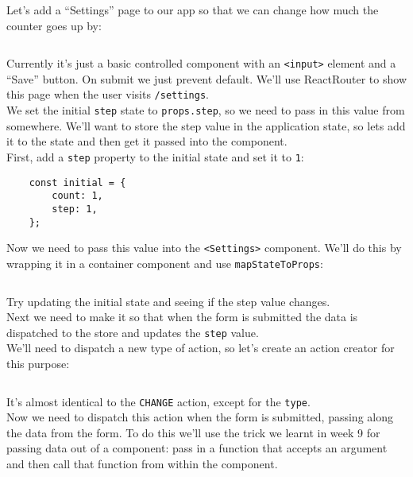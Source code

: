 Let's add a ``Settings'' page to our app so that we can change how much the counter goes up by:

\inputminted{jsx}{03/figures/04-Settings.jsx}

Currently it's just a basic controlled component with an \texttt{<input>} element and a ``Save'' button. On submit we just prevent default. We'll use ReactRouter to show this page when the user visits \texttt{/settings}.
\\

We set the initial \texttt{step} state to \texttt{props.step}, so we need to pass in this value from somewhere. We'll want to store the step value in the application state, so lets add it to the state and then get it passed into the component.
\\

First, add a \texttt{step} property to the initial state and set it to \texttt{1}:

\begin{verbatim}
    const initial = {
        count: 1,
        step: 1,
    };
\end{verbatim}

Now we need to pass this value into the \texttt{<Settings>} component. We'll do this by wrapping it in a container component and use \texttt{mapStateToProps}:

\inputminted{js}{03/figures/05-SettingsProps.js}

Try updating the initial state and seeing if the step value changes.
\\

Next we need to make it so that when the form is submitted the data is dispatched to the store and updates the \texttt{step} value.
\\

We'll need to dispatch a new type of action, so let's create an action creator for this purpose:

\inputminted{js}{03/figures/06-action.js}

It's almost identical to the \texttt{CHANGE} action, except for the \texttt{type}.
\\

Now we need to dispatch this action when the form is submitted, passing along the data from the form. To do this we'll use the trick we learnt in week 9 for passing data out of a component: pass in a function that accepts an argument and then call that function from within the component.
\\

